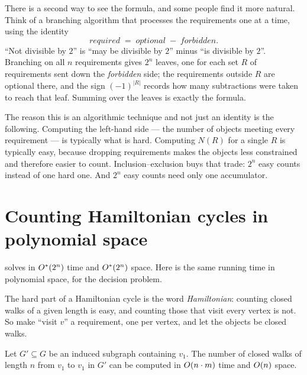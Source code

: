 \begin{intuition}
There is a second way to see the formula, and some people find it more natural.
Think of a branching algorithm that processes the requirements one at a time,
using the identity
\[ \textit{required} \;=\; \textit{optional} \;-\; \textit{forbidden}. \]
``Not divisible by $2$'' is ``may be divisible by $2$'' minus ``is divisible by
$2$''. Branching on all $n$ requirements gives $2^n$ leaves, one for each set
$R$ of requirements sent down the \emph{forbidden} side; the requirements
outside $R$ are optional there, and the sign $(-1)^{|R|}$ records how many
subtractions were taken to reach that leaf. Summing over the leaves is exactly
the formula.
\end{intuition}

The reason this is an algorithmic technique and not just an identity is the
following. Computing the left-hand side --- the number of objects meeting every
requirement --- is typically what is hard. Computing $N(R)$ for a single $R$ is
typically easy, because dropping requirements makes the objects less
constrained and therefore easier to count. Inclusion--exclusion buys that trade:
$2^n$ easy counts instead of one hard one. And $2^n$ easy counts need only one
accumulator.

\section{Counting Hamiltonian cycles in polynomial space}
\label{sec:ie-hamilton}

 solves  in $O^{*}(2^n)$ time and $O^{*}(2^n)$
space. Here is the same running time in polynomial space, for the decision
problem.

The hard part of a Hamiltonian cycle is the word \emph{Hamiltonian}: counting
closed walks of a given length is easy, and counting those that visit every
vertex is not. So make ``visit $v$'' a requirement, one per vertex, and let the
objects be closed walks.

\begin{lemma}\label{lem:counting-walks}
Let $G' \subseteq G$ be an induced subgraph containing $v_1$. The number of
closed walks of length $n$ from $v_1$ to $v_1$ in $G'$ can be computed in
$O\!\left(n \cdot m\right)$ time and $O\!\left(n\right)$ space.
\end{lemma}


